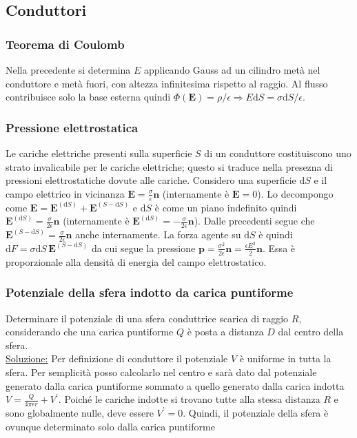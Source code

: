 \documentclass[11pt,a4paper]{article}
\newcommand{\de}{\mathrm d}
\begin{document}
\subsection{Conduttori}

\subsubsection{Teorema di Coulomb}
Nella precedente si determina $E$ applicando Gauss ad un cilindro metà nel conduttore e metà fuori, con altezza infinitesima rispetto al raggio. Al flusso contribuisce solo la base esterna quindi $\Phi(\mathbf E)=\rho/\epsilon \Rightarrow E\de S=\sigma\de S/\epsilon$. 

\subsubsection{Pressione elettrostatica}
Le cariche elettriche presenti sulla superficie $S$ di un conduttore costituiscono uno strato invalicabile per le cariche elettriche; questo si traduce nella presezna di pressioni elettrostatiche dovute alle cariche. Considero una superficie $\de S$ e il campo elettrico in vicinanza $\mathbf E=\frac{\sigma}{\epsilon}\mathbf n$ (internamente è $\mathbf E=0$). Lo decompongo come $\mathbf E = \mathbf E^{(\de S)} + \mathbf E^{(S-\de S)}$ e $\de S$ è come un piano indefinito quindi $\mathbf E^{(\de S)}=\frac{\sigma}{2\epsilon}\mathbf n$ (internamente è $\mathbf E^{(\de S)}=-\frac{\sigma}{2\epsilon}\mathbf n$). Dalle precedenti segue che $\mathbf E^{(S-\de S)}=\frac{\sigma}{2\epsilon}\mathbf n$ anche internamente. La forza agente su $\de S$ è quindi $\de F=\sigma\de S\,\mathbf E^{(S-\de S)}$ da cui segue la pressione $\mathbf p = \frac{\sigma^2}{2\epsilon}\mathbf n=\frac{\epsilon E^2}2\mathbf n$. Essa è proporzionale alla densità di energia del campo elettrostatico.

\subsubsection{Potenziale della sfera indotto da carica puntiforme}
Determinare il potenziale di una sfera conduttrice scarica di raggio $R$, considerando che una carica puntiforme $Q$ è posta a distanza $D$ dal centro della sfera.\\
\underline{Soluzione:} Per definizione di conduttore il potenziale $V$ è uniforme in tutta la sfera. Per semplicità posso calcolarlo nel centro e sarà dato dal potenziale generato dalla carica puntiforme sommato a quello generato dalla carica indotta $V=\frac{Q}{4\pi\epsilon r}+V^\prime$. Poiché le cariche indotte si trovano tutte alla stessa distanza $R$ e sono globalmente nulle, deve essere $V^\prime=0$. Quindi, il potenziale della sfera è ovunque determinato solo dalla carica puntiforme
\end{document}
